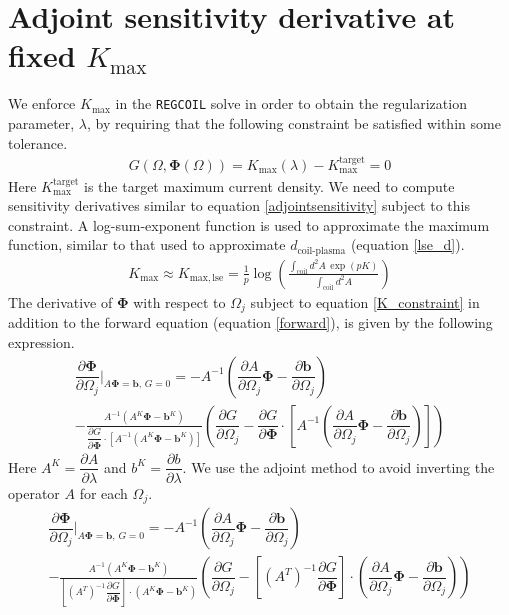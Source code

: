 \documentclass[aps,unsortedaddress]{revtex4-1}
\newcommand{\partder}[2]{\dfrac{\partial  #1}{\partial  #2}}
\begin{document}
\section{Adjoint sensitivity derivative at fixed $K_{\text{max}}$}
\label{lambda_search}
We enforce $K_{\text{max}}$ in the \texttt{REGCOIL} solve in order to obtain the regularization parameter, $\lambda$, by requiring that the following constraint be satisfied within some tolerance. 
\begin{gather}
G(\Omega, \bm{\Phi}(\Omega)) = K_{\text{max}}(\lambda) - K^{\text{target}}_{\text{max}}  = 0 
\label{K_constraint}
\end{gather}
Here $K^{\text{target}}_{\text{max}}$ is the target maximum current density. We need to compute sensitivity derivatives similar to equation \ref{adjointsensitivity} subject to this constraint. A log-sum-exponent function is used to approximate the maximum function, similar to that used to approximate $d_{\text{coil-plasma}}$ (equation \ref{lse_d}).
\begin{gather}
K_{\text{max}} \approx K_{\text{max},\, \text{lse}} =  \frac{1}{p} \log \left( \frac{\int_{\text{coil}} d^2 A \,  \exp\left(p K\right)}{ \int_{\text{coil}} d^2 A } \right)
\end{gather}
The derivative of $\bm{\Phi}$ with respect to $\Omega_j$ subject to equation \ref{K_constraint} in addition to the forward equation (equation \ref{forward}), is given by the following expression. 
\begin{multline}
\partder{\bm{\Phi}}{\Omega_j} \bigg \rvert_{A \bm{\Phi} = \bm{b}, \, G = 0} = - A^{-1} \left( \partder{A}{\Omega_j} \bm{\Phi} - \partder{\bm{b}}{\Omega_j} \right)\\ - \frac{A^{-1} \left( A^K \bm{\Phi} - \bm{b}^K \right) }{ \partder{G}{\bm{\Phi}} \cdot \left[ A^{-1} \left( A^K \bm{\Phi} - \bm{b}^K \right) \right] } \left( \partder{G}{\Omega_j} - \partder{G}{\bm{\Phi}} \cdot \left[ A^{-1} \left( \partder{A}{\Omega_j} \bm{\Phi} - \partder{\bm{b}}{\Omega_j} \right) \right] \right) 
\end{multline}
Here $A^K = \partder{A}{\lambda}$ and $b^K = \partder{b}{\lambda}$. We use the adjoint method to avoid inverting the operator $A$ for each $\Omega_j$.
\begin{multline}
\partder{\bm{\Phi}}{\Omega_j} \bigg \rvert_{A \bm{\Phi} = \bm{b}, \, G = 0} = - A^{-1} \left( \partder{A}{\Omega_j} \bm{\Phi} - \partder{\bm{b}}{\Omega_j} \right)\\ - \frac{A^{-1} \left( A^K \bm{\Phi} - \bm{b}^K \right) }{ \left[ \left( A^T \right)^{-1} \partder{G}{\bm{\Phi}} \right] \cdot \left( A^K \bm{\Phi} - \bm{b}^K \right) } \left( \partder{G}{\Omega_j} - \left[ \left( A^T \right)^{-1} \partder{G}{\bm{\Phi}} \right]  \cdot \left( \partder{A}{\Omega_j} \bm{\Phi} - \partder{\bm{b}}{\Omega_j} \right) \right) 
\label{withadjoint}
\end{multline}
\end{document}
